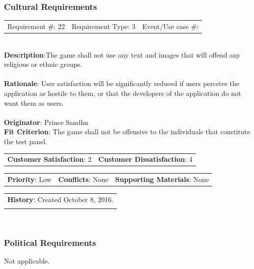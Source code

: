 \documentclass[12pt, titlepage]{article}
\begin{document}
\subsubsection{Cultural Requirements}
\begin{reqbox}

\begin{tabular}{lll}
Requirement \#: 22 & Requirement Type: 3 & Event/Use case \#: \\
\end{tabular} \\

\textbf{Description}:The game shall not use any text and images that will offend any religious or ethnic groups. \\ \\
\textbf{Rationale}: User satisfaction will be significantly reduced if users perceive the application as hostile to them, or that the
developers of the application do not want them as users. \\ \\
\textbf{Originator}: Prince Sandhu \\
\textbf{Fit Criterion}: The game shall not be offensive to the individuals that constitute the test panel. \\

\begin{tabular}{ll}
\textbf{Customer Satisfaction}: 2 & \textbf{Customer Dissatisfaction}: 4 \\
\end{tabular}

\begin{tabular}{lll}
\textbf{Priority}: Low & \textbf{Conflicts}: None & \textbf{Supporting Materials}: None \\
\end{tabular}

\begin{tabular}{l}
\textbf{History}: Created October 8, 2016.\\ \\
\end{tabular} \\

\end{reqbox}

\subsubsection{Political Requirements}
Not applicable.
\end{document}
